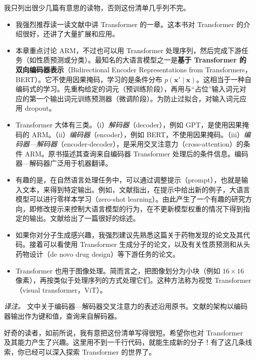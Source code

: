 我只列出很少几篇有意思的读物，否则这份清单几乎列不完。
\begin{itemize}
\item 我强烈推荐读一读文献中讲 Transformer 的一章。这本书对 Transformer 的介绍很好，还讲了大量扩展和应用。
\item 本章重点讨论 ARM，不过也可以用 Transformer 处理序列，然后完成下游任务（如性质预测或分类）。最知名的大语言模型之一是\textbf{基于 Transformer 的双向编码器表示}（Bidirectional Encoder Representations from Transformers，BERT）。它不使用因果掩码，学习的是条件分布 $p(\mathbf{x}'\mid\mathbf{x})$。这相当于一种自编码式的学习。先重构给定的词元（预训练阶段），再用与“占位”输入词元对应的第一个输出词元训练预测器（微调阶段）。为防止过拟合，对输入词元应用 dropout。
\item Transformer 大体有三类。（i）\emph{解码器}（decoder），例如 GPT，是使用因果掩码的 ARM。（ii）\emph{编码器}（encoder），例如 BERT，不使用因果掩码。（iii）\emph{编码器—解码器}（encoder-decoder），是采用交叉注意力（cross-attention）的条件 ARM。原书描述其查询来自编码器 Transformer 处理后的条件信息。编码器—解码器广泛用于机器翻译。
\item 有趣的是，在自然语言处理任务中，可以通过调整提示（prompt），也就是输入文本，来得到特定输出。例如，文献指出，在提示中给出新的例子，大语言模型可以进行零样本学习（zero-shot learning）。由此产生了一个有趣的研究方向，即修改提示来控制大语言模型的行为，在不更新模型权重的情况下得到指定的输出。文献给出了一篇很好的综述。
\item 如果你对分子生成感兴趣，我强烈建议先熟悉这篇关于药物发现的论文及其代码。接着可以看使用 Transformer 生成分子的论文，以及有关性质预测和从头药物设计（de novo drug design）等下游任务的论文。
\item Transformer 也用于图像处理。简而言之，把图像划分为小块（例如 $16\times16$ 像素），再按类似于处理序列的方式处理它们。这种方法称为视觉 Transformer（visual transformer，ViT）。
\end{itemize}
\emph{译注。} 文中关于编码器—解码器交叉注意力的表述沿用原书。文献的架构以编码器输出作为键和值，查询来自解码器。

好奇的读者，如前所说，我有意把这份清单写得很短。希望你也对 Transformer 及其能力产生了兴趣。这里用不到一千行代码，就能生成新的分子！有了这几条线索，你已经可以深入探索 Transformer 的世界了。

\FloatBarrier

